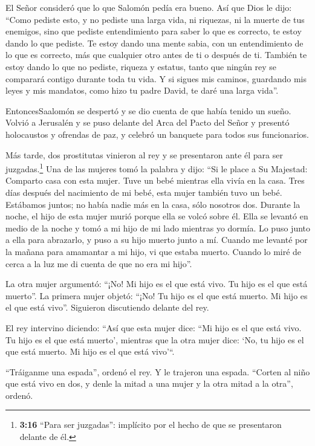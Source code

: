  El Señor consideró que lo que Salomón pedía era bueno.
 Así que Dios le dijo: ``Como pediste esto, y no pediste
una larga vida, ni riquezas, ni la muerte de tus enemigos, sino que
pediste entendimiento para saber lo que es correcto,  te
estoy dando lo que pediste. Te estoy dando una mente sabia, con un
entendimiento de lo que es correcto, más que cualquier otro antes de ti
o después de ti.  También te estoy dando lo que no pediste,
riqueza y estatus, tanto que ningún rey se comparará contigo durante
toda tu vida.  Y si sigues mis caminos, guardando mis leyes
y mis mandatos, como hizo tu padre David, te daré una larga vida''.

 EntoncesSaalomón se despertó y se dio cuenta de que había
tenido un sueño. Volvió a Jerusalén y se puso delante del Arca del Pacto
del Señor y presentó holocaustos y ofrendas de paz, y celebró un
banquete para todos sus funcionarios.

 Más tarde, dos prostitutas vinieron al rey y se
presentaron ante él para ser juzgadas.\footnote{\textbf{3:16} ``Para ser
  juzgadas'': implícito por el hecho de que se presentaron delante de
  él.}  Una de las mujeres tomó la palabra y dijo: ``Si le
place a Su Majestad: Comparto casa con esta mujer. Tuve un bebé mientras
ella vivía en la casa.  Tres días después del nacimiento de
mi bebé, esta mujer también tuvo un bebé. Estábamos juntos; no había
nadie más en la casa, sólo nosotros dos.  Durante la noche,
el hijo de esta mujer murió porque ella se volcó sobre él. 
Ella se levantó en medio de la noche y tomó a mi hijo de mi lado
mientras yo dormía. Lo puso junto a ella para abrazarlo, y puso a su
hijo muerto junto a mí. Cuando me levanté por la mañana para amamantar a
mi hijo, vi que estaba muerto. Cuando lo miré de cerca a la luz me di
cuenta de que no era mi hijo''.

 La otra mujer argumentó: ``¡No! Mi hijo es el que está
vivo. Tu hijo es el que está muerto''. La primera mujer objetó: ``¡No!
Tu hijo es el que está muerto. Mi hijo es el que está vivo''. Siguieron
discutiendo delante del rey.

 El rey intervino diciendo: ``Así que esta mujer dice: ``Mi
hijo es el que está vivo. Tu hijo es el que está muerto', mientras que
la otra mujer dice: `No, tu hijo es el que está muerto. Mi hijo es el
que está vivo'``.

 ``Tráiganme una espada'', ordenó el rey. Y le trajeron una
espada.  ``Corten al niño que está vivo en dos, y denle la
mitad a una mujer y la otra mitad a la otra'', ordenó.

